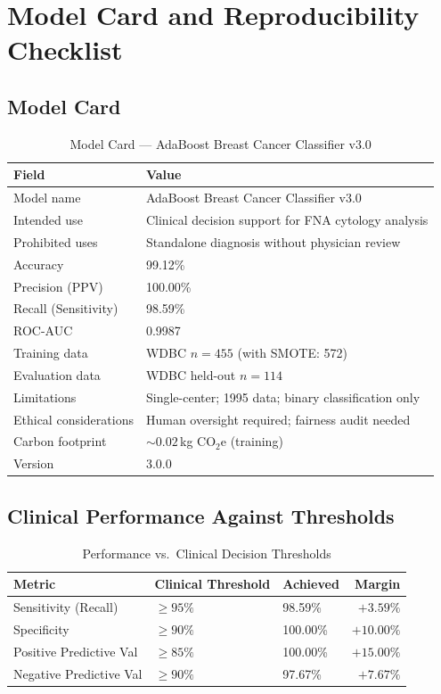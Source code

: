 \documentclass[10pt,letterpaper]{article}
\begin{document}
\section{Model Card and Reproducibility Checklist}

\subsection{Model Card}

\begin{table}[h]
\centering
\caption{Model Card --- AdaBoost Breast Cancer Classifier v3.0}
\label{tab:model_card}
\begin{tabular}{ll}
\toprule
\textbf{Field} & \textbf{Value} \\
\midrule
Model name            & AdaBoost Breast Cancer Classifier v3.0 \\
Intended use          & Clinical decision support for FNA cytology analysis \\
Prohibited uses       & Standalone diagnosis without physician review \\
Accuracy              & 99.12\% \\
Precision (PPV)       & 100.00\% \\
Recall (Sensitivity)  & 98.59\% \\
ROC-AUC               & 0.9987 \\
Training data         & WDBC $n=455$ (with SMOTE: 572) \\
Evaluation data       & WDBC held-out $n=114$ \\
Limitations           & Single-center; 1995 data; binary classification only \\
Ethical considerations & Human oversight required; fairness audit needed \\
Carbon footprint       & $\sim 0.02$\,kg CO$_2$e (training) \\
Version               & 3.0.0 \\
\bottomrule
\end{tabular}
\end{table}

\subsection{Clinical Performance Against Thresholds}

\begin{table}[h]
\centering
\caption{Performance vs.\ Clinical Decision Thresholds}
\label{tab:clinical_thresholds}
\begin{tabular}{lllr}
\toprule
\textbf{Metric} & \textbf{Clinical Threshold} & \textbf{Achieved} & \textbf{Margin} \\
\midrule
Sensitivity (Recall)    & $\geq 95\%$ & 98.59\%  & $+3.59\%$ \\
Specificity             & $\geq 90\%$ & 100.00\% & $+10.00\%$ \\
Positive Predictive Val & $\geq 85\%$ & 100.00\% & $+15.00\%$ \\
Negative Predictive Val & $\geq 90\%$ & 97.67\%  & $+7.67\%$ \\
\bottomrule
\end{tabular}
\end{table}
\end{document}
